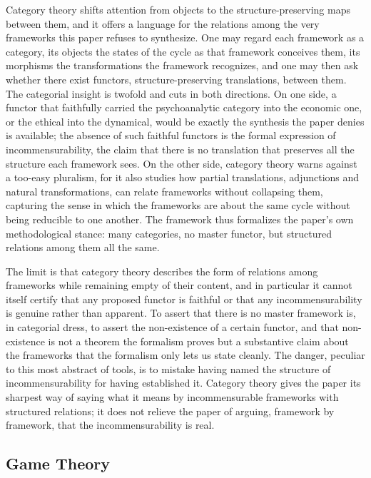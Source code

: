 \documentclass[11pt,a4paper]{article}
\begin{document}
Category theory shifts attention from objects to the structure-preserving maps between them, and it offers a language for the relations among the very frameworks this paper refuses to synthesize. One may regard each framework as a category, its objects the states of the cycle as that framework conceives them, its morphisms the transformations the framework recognizes, and one may then ask whether there exist functors, structure-preserving translations, between them. The categorial insight is twofold and cuts in both directions. On one side, a functor that faithfully carried the psychoanalytic category into the economic one, or the ethical into the dynamical, would be exactly the synthesis the paper denies is available; the absence of such faithful functors is the formal expression of incommensurability, the claim that there is no translation that preserves all the structure each framework sees. On the other side, category theory warns against a too-easy pluralism, for it also studies how partial translations, adjunctions and natural transformations, can relate frameworks without collapsing them, capturing the sense in which the frameworks are about the same cycle without being reducible to one another. The framework thus formalizes the paper's own methodological stance: many categories, no master functor, but structured relations among them all the same.

The limit is that category theory describes the form of relations among frameworks while remaining empty of their content, and in particular it cannot itself certify that any proposed functor is faithful or that any incommensurability is genuine rather than apparent. To assert that there is no master framework is, in categorial dress, to assert the non-existence of a certain functor, and that non-existence is not a theorem the formalism proves but a substantive claim about the frameworks that the formalism only lets us state cleanly. The danger, peculiar to this most abstract of tools, is to mistake having named the structure of incommensurability for having established it. Category theory gives the paper its sharpest way of saying what it means by incommensurable frameworks with structured relations; it does not relieve the paper of arguing, framework by framework, that the incommensurability is real.

\subsection{Game Theory}
\end{document}
